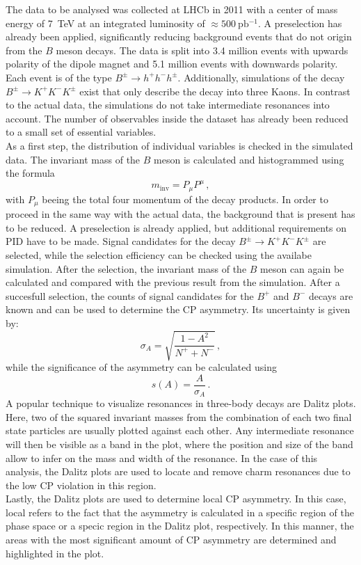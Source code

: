 The data to be analysed was collected at LHCb in 2011 with a center of mass energy of \qty{7}{\tera\electronvolt} at an integrated luminosity of $\approx \qty{500}{\pico\barn^{-1}}$.
A preselection has already been applied, significantly reducing background events that do not origin from the $B$ meson decays.
The data is split into 3.4 million events with upwards polarity of the dipole magnet and 5.1 million events with downwards polarity. Each event is of the type
$B^\pm \rightarrow h^+ h^- h^\pm$. Additionally, simulations of the decay $B^\pm \rightarrow K^+ K^- K^\pm$ exist that only describe the decay into three Kaons.
In contrast to the actual data, the simulations do not take intermediate resonances into account. The number of observables inside the dataset has already been reduced
to a small set of essential variables. \\
As a first step, the distribution of individual variables is checked in the simulated data. The invariant mass of the $B$ meson is calculated and histogrammed using the formula
\begin{equation}
	m_{\text{inv}} = P_\mu P^\mu \, ,
	\label{eq:inv_mass}
\end{equation}
with $P_\mu$ beeing the total four momentum of the decay products.
In order to proceed in the same way with the actual data, the background that is present has to be reduced. A preselection is already applied, but additional requirements on PID have to be made.
Signal candidates for the decay $B^\pm \rightarrow K^+ K^- K^\pm$ are selected, while the selection efficiency can be checked using the availabe simulation.
After the selection, the invariant mass of the $B$ meson can again be calculated and compared with the previous result from the simulation.
After a succesfull selection, the counts of signal candidates for the $B^+$ and $B^-$ decays are known and can be used to determine the CP asymmetry. Its uncertainty is given by:
\begin{equation}
	\sigma_A = \sqrt{\frac{1-A^2}{N^+ + N^-}} \, ,
	\label{eq:A_error}
\end{equation}
while the significance of the asymmetry can be calculated using
\begin{equation}
	s(A) = \frac{A}{\sigma_A} \, .
	\label{eq:A_sigma}
\end{equation}
A popular technique to visualize resonances in three-body decays are Dalitz plots. Here, two of the squared invariant masses from the combination of each two final state particles
are usually plotted against each other. Any intermediate resonance will then be visible as a band in the plot, where the position and size of the band allow to infer on
the mass and width of the resonance. In the case of this analysis, the Dalitz plots are used to locate and remove charm resonances due to the low CP violation in this region.\\
Lastly, the Dalitz plots are used to determine local CP asymmetry. In this case, local refers to the fact that the asymmetry is calculated in a specific region of the phase space
or a specic region in the Dalitz plot, respectively. In this manner, the areas with the most significant amount of CP asymmetry are determined and highlighted in the plot.



